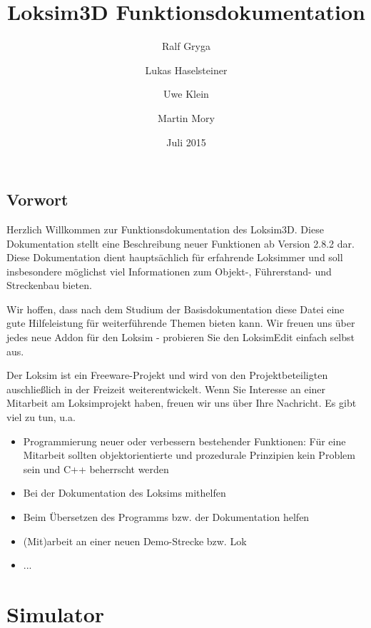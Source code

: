 \documentclass[11pt, a4paper]{refrep}
\begin{document}
\author{Ralf Gryga \and Lukas Haselsteiner \and Uwe Klein \and Martin Mory} 
\title{Loksim3D Funktionsdokumentation} 
\date{Juli 2015} 

\maketitle


\chapter{Vorwort}
Herzlich Willkommen zur Funktionsdokumentation des Loksim3D. Diese
Dokumentation stellt eine Beschreibung neuer Funktionen ab
Version 2.8.2 dar. Diese Dokumentation dient hauptsächlich für erfahrende Loksimmer 
und soll insbesondere möglichst viel Informationen zum
Objekt-, Führerstand- und Streckenbau bieten.

Wir hoffen, dass nach dem Studium der Basisdokumentation diese Datei
eine gute Hilfeleistung für weiterführende Themen bieten kann. Wir
freuen uns über jedes neue Addon für den Loksim - probieren Sie den
LoksimEdit einfach selbst aus.

Der Loksim ist ein Freeware-Projekt und wird von den Projektbeteiligten
auschließlich in der Freizeit weiterentwickelt. Wenn Sie Interesse an
einer Mitarbeit am Loksimprojekt haben, freuen wir uns über Ihre
Nachricht. Es gibt viel zu tun, u.a.

\begin{itemize}
\item
  Programmierung neuer oder verbessern bestehender Funktionen: 
  Für eine Mitarbeit sollten objektorientierte und prozedurale 
  Prinzipien kein Problem sein und C++ beherrscht werden
\item
  Bei der Dokumentation des Loksims mithelfen
\item
  Beim Übersetzen des Programms bzw. der Dokumentation helfen
\item 
  (Mit)arbeit an einer neuen Demo-Strecke bzw. Lok
\item ...
\end{itemize}

\clearpage



\tableofcontents 

\part{Simulator}
\end{document}

